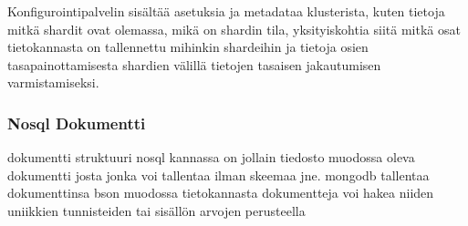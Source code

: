 Konfigurointipalvelin sisältää asetuksia ja metadataa klusterista, 
kuten tietoja mitkä shardit ovat olemassa, mikä on shardin tila,
yksityiskohtia siitä mitkä osat tietokannasta on tallennettu mihinkin shardeihin
ja tietoja osien tasapainottamisesta shardien välillä tietojen tasaisen jakautumisen varmistamiseksi.



\subsubsection{Nosql Dokumentti}



dokumentti struktuuri nosql kannassa on jollain tiedosto muodossa oleva dokumentti josta jonka voi tallentaa ilman skeemaa jne.
mongodb tallentaa dokumenttinsa bson muodossa
tietokannasta dokumentteja voi hakea niiden uniikkien tunnisteiden tai sisällön arvojen perusteella
\medskip


















    





